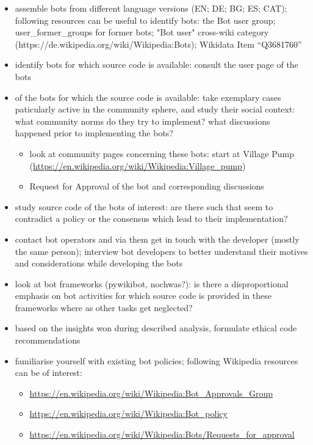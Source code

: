 \documentclass[pdftex,a4paper,11pt]{scrartcl}
\begin{document}
\begin{itemize}
    \item assemble bots from different language versions (EN; DE; BG; ES; CAT); following resources can be useful to identify bots: the Bot user group; user_former_groups for former bots; "Bot user" cross-wiki category (https://de.wikipedia.org/wiki/Wikipedia:Bots); Wikidata Item “Q3681760”
    \item identify bots for which source code is available: consult the user page of the bots
    \item of the bots for which the source code is available: take exemplary cases paticularly active in the community sphere, and study their social context: what community norms do they try to implement? what discussions happened prior to implementing the bots?
    \begin{itemize}
        \item look at community pages concerning these bots: start at Village Pump (\url{https://en.wikipedia.org/wiki/Wikipedia:Village_pump})
        \item Request for Approval of the bot and corresponding discussions
    \end{itemize}
    \item study source code of the bots of interest: are there such that seem to contradict a policy or the consensus which lead to their implementation?
    \item contact bot operators and via them get in touch with the developer (mostly the same person); interview bot developers to better understand their motives and considerations while developing the bots
    \item look at bot frameworks (pywikibot, nochwas?): is there a disproportional emphasis on bot activities for which source code is provided in these frameworks where as other tasks get neglected?
    \item based on the insights won during described analysis, formulate ethical code recommendations
    \item familiarise yourself with existing bot policies; following Wikipedia resources can be of interest:
    \begin{itemize}
        \item \url{https://en.wikipedia.org/wiki/Wikipedia:Bot_Approvals_Group}
        \item \url{https://en.wikipedia.org/wiki/Wikipedia:Bot_policy}
        \item \url{https://en.wikipedia.org/wiki/Wikipedia:Bots/Requests_for_approval}
    \end{itemize}
\end{itemize}
\end{document}

